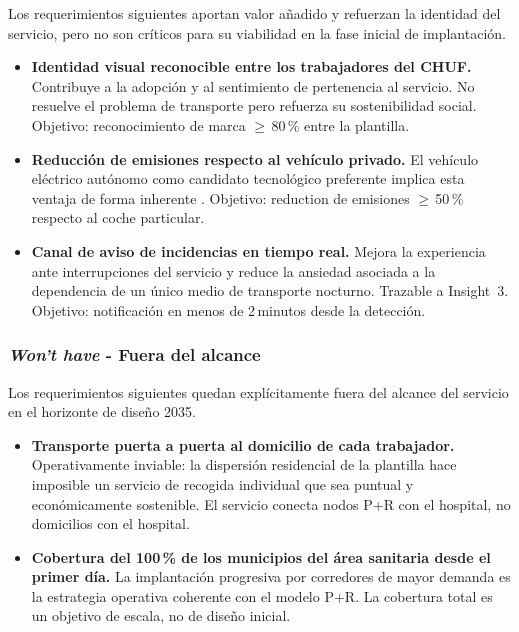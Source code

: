 Los requerimientos siguientes aportan valor añadido y refuerzan
la identidad del servicio, pero no son críticos para su viabilidad
en la fase inicial de implantación.

\begin{itemize}

	\item \textbf{Identidad visual reconocible entre los trabajadores
	del CHUF.} Contribuye a la adopción y al sentimiento de
	pertenencia al servicio. No resuelve el problema de transporte
	pero refuerza su sostenibilidad social.
	Objetivo: reconocimiento de marca $\geq$\,80\,\% entre la plantilla.

	\item \textbf{Reducción de emisiones respecto al vehículo privado.}
	El vehículo eléctrico autónomo como candidato tecnológico preferente
	implica esta ventaja de forma inherente \parencite{SHOW2024Legacy}.
	Objetivo: reduction de emisiones $\geq$\,50\,\% respecto al coche
	particular.

	\item \textbf{Canal de aviso de incidencias en tiempo real.}
	Mejora la experiencia ante interrupciones del servicio y reduce
	la ansiedad asociada a la dependencia de un único medio de
	transporte nocturno. Trazable a Insight~3.
	Objetivo: notificación en menos de 2\,minutos desde la detección.

\end{itemize}

\subsubsection{\textit{Won't have} - Fuera del alcance}
\label{sec:moscow-wont}

Los requerimientos siguientes quedan explícitamente fuera del
alcance del servicio en el horizonte de diseño 2035.

\begin{itemize}

	\item \textbf{Transporte puerta a puerta al domicilio de cada
	trabajador.} Operativamente inviable: la dispersión residencial
	de la plantilla hace imposible un servicio de recogida individual
	que sea puntual y económicamente sostenible. El servicio conecta
	nodos P+R con el hospital, no domicilios con el hospital.

	\item \textbf{Cobertura del 100\,\% de los municipios del área
	sanitaria desde el primer día.} La implantación progresiva por
	corredores de mayor demanda es la estrategia operativa coherente
	con el modelo P+R. La cobertura total es un objetivo de escala,
	no de diseño inicial.

\end{itemize}

